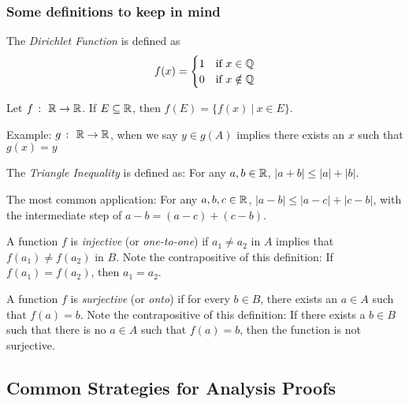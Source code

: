 \subsubsection{Some definitions to keep in mind}


\begin{definition}
    The \textit{Dirichlet Function} is defined as \[f(x) = \begin{cases} 1 & \text{if } x \in \mathbb{Q} \\ 0 & \text{if } x \notin \mathbb{Q} \end{cases}\]
\end{definition}

\begin{definition}
    Let \(f \ \colon \ \mathbb{R} \rightarrow \mathbb{R}\). If \(E \subseteq \mathbb{R}\), then \(f(E) = \{f(x) \ | \ x \in E\}\).
\end{definition}

Example: \(g \ \colon \ \mathbb{R} \rightarrow \mathbb{R}\), when we say \(y \in g(A)\) implies there exists an \(x\) such that \(g(x) = y\) \\

\hypertarget{Triangle Inequality}{}
\begin{definition}
    The \textit{Triangle Inequality} is defined as: For any \(a,b \in \mathbb{R}\), \(|a + b| \leq  |a| + |b|\).
\end{definition}
The most common application: For any \(a,b,c \in \mathbb{R}\), \(|a - b| \leq |a-c| + |c-b|\), with the intermediate step of \(a - b = (a-c) + (c-b)\).

\begin{definition}
    A function \(f\) is \textit{injective} (or \textit{one-to-one}) if \(a_1 \ne a_2\) in \(A\) implies that \(f(a_1) \ne f(a_2)\) in \(B\). Note the contrapositive of this definition: If \(f(a_1) = f(a_2)\), then \(a_1 = a_2\).
\end{definition}

\begin{definition}
    A function \(f\) is \textit{surjective} (or \textit{onto}) if for every \(b \in B\), there exists an \(a \in A\) such that \(f(a) = b\). Note the contrapositive of this definition: If there exists a \(b \in B\) such that there is no \(a \in A\) such that \(f(a) = b\), then the function is not surjective.
\end{definition}

\subsection{Common Strategies for Analysis Proofs}


